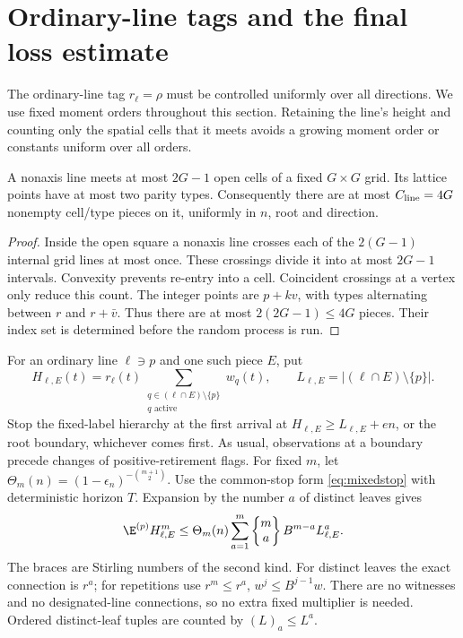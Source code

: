 \section{Ordinary-line tags and the final loss estimate}\label{sec:closing}

The ordinary-line tag \(r_\ell=\rho\) must be controlled uniformly
over all directions. We use fixed moment orders throughout this
section. Retaining the line's height and counting only the spatial
cells that it meets avoids a growing moment order or constants
uniform over all orders.

\begin{lemma}\label{lem:cells}
A nonaxis line meets at most \(2G-1\) open cells of a fixed
\(G\times G\) grid. Its lattice points have at most two parity types.
Consequently there are at most \(C_{\rm line}=4G\) nonempty cell/type
pieces on it, uniformly in \(n\), root and direction.
\end{lemma}
\begin{proof}
Inside the open square a nonaxis line crosses each of the
\(2(G-1)\) internal grid lines at most once. These crossings divide
it into at most \(2G-1\) intervals. Convexity prevents re-entry
into a cell. Coincident crossings at a vertex only reduce this count.
The integer points are \(p+kv\), with types alternating between
\(r\) and \(r+\bar v\). Thus there are at most
\(2(2G-1)\le4G\) pieces. Their index set is determined before the
random process is run.
\end{proof}

For an ordinary line \(\ell\ni p\) and one such piece \(E\), put
\[
 H_{\ell,E}(t)=r_\ell(t)
       \sum_{\substack{q\in(\ell\cap E)\setminus\{p\}\\q\text{ active}}}w_q(t),
 \qquad L_{\ell,E}=| (\ell\cap E)\setminus\{p\}|.
\]
Stop the fixed-label hierarchy at the first arrival at
\(H_{\ell,E}\ge L_{\ell,E}+en\), or the root boundary, whichever
comes first. As usual, observations at a boundary precede changes
of positive-retirement flags. For fixed \(m\), let
\(\Theta_m(n)=(1-\epsilon_n)^{-\binom{m+1}2}\).
Use the common-stop form \eqref{eq:mixedstop} with deterministic
horizon \(T\). Expansion by the number \(a\) of distinct leaves gives
\begin{equation}\label{eq:tagmoment}
 \E^{(p)}H_{\ell,E}^m
 \le\Theta_m(n)\sum_{a=1}^m
 \left\{\begin{matrix}m\\a\end{matrix}\right\}
 B^{m-a}L_{\ell,E}^a.
\end{equation}
The braces are Stirling numbers of the second kind. For distinct
leaves the exact connection is \(r^a\); for repetitions use
\(r^m\le r^a\), \(w^j\le B^{j-1}w\). There are no witnesses and
no designated-line connections, so no extra fixed multiplier is
needed. Ordered distinct-leaf tuples are counted by
\((L)_a\le L^a\).

